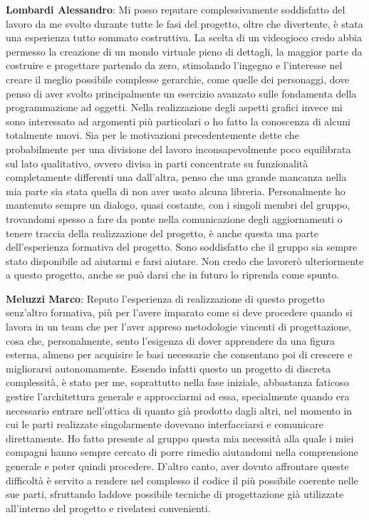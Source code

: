 \documentclass[a4paper,12pt, hidelinks]{report}
\begin{document}
	\item \textbf{Lombardi Alessandro}: Mi posso reputare complessivamente soddisfatto del lavoro da me svolto durante tutte le fasi del progetto, oltre che divertente, è stata una esperienza tutto sommato costruttiva. La scelta di un videogioco credo abbia permesso la creazione di un mondo virtuale pieno di dettagli, la maggior parte da costruire e progettare partendo da zero, stimolando l'ingegno e l'interesse nel creare il meglio possibile complesse gerarchie, come quelle dei personaggi, dove penso di aver svolto principalmente un esercizio avanzato sulle fondamenta della programmazione ad oggetti. Nella realizzazione degli aspetti grafici invece mi sono interessato ad argomenti più particolari o ho fatto la conoscenza di alcuni totalmente nuovi. Sia per le motivazioni precedentemente dette che probabilmente per una divisione del lavoro inconsapevolmente poco equilibrata sul lato qualitativo, ovvero divisa in parti concentrate su funzionalità completamente differenti una dall'altra, penso che una grande mancanza nella mia parte sia stata quella di non aver usato alcuna libreria. Personalmente ho mantenuto sempre un dialogo, quasi costante, con i singoli membri del gruppo, trovandomi spesso a fare da ponte nella comunicazione degli aggiornamenti o tenere traccia della realizzazione del progetto, è anche questa una parte dell'esperienza formativa del progetto. Sono soddisfatto che il gruppo sia sempre stato disponibile ad aiutarmi e farsi aiutare. Non credo che lavorerò ulteriormente a questo progetto, anche se può darsi che in futuro lo riprenda come spunto.

	\item \textbf{Meluzzi Marco}: Reputo l'esperienza di realizzazione di questo progetto senz'altro formativa, più per l'avere imparato come si deve procedere quando si lavora in un team che per l'aver appreso metodologie vincenti di progettazione, cosa che, personalmente, sento l'esigenza di dover apprendere da una figura esterna, almeno per acquisire le basi necessarie che consentano poi di crescere e migliorarsi autonomamente. Essendo infatti questo un progetto di discreta complessità, è stato per me, soprattutto nella fase iniziale, abbastanza faticoso gestire l'architettura generale e approcciarmi ad essa, specialmente quando era necessario entrare nell'ottica di quanto già prodotto dagli altri, nel momento in cui le parti realizzate singolarmente dovevano interfacciarsi e comunicare direttamente. Ho fatto presente al gruppo questa mia necessità alla quale i miei compagni hanno sempre cercato di porre rimedio aiutandomi nella comprensione generale e poter quindi procedere. D'altro canto, aver dovuto affrontare queste difficoltà è servito a rendere nel complesso il codice il più possibile coerente nelle sue parti, sfruttando laddove possibile tecniche di progettazione già utilizzate all'interno del progetto e rivelatesi convenienti.
	
\end{document}
